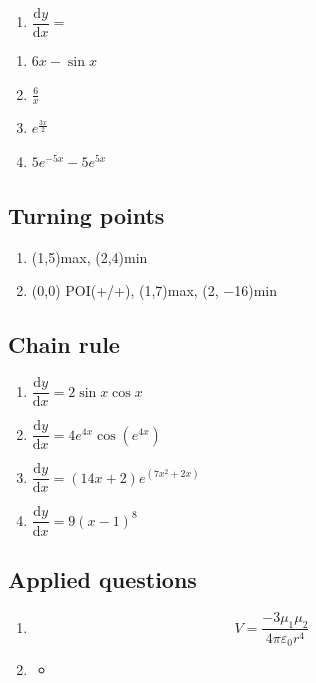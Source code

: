 \documentclass[
]{book}
\providecommand{\tightlist}{%
  \setlength{\itemsep}{0pt}\setlength{\parskip}{0pt}}
\begin{document}
\begin{enumerate}
\def\labelenumi{\arabic{enumi}.}
\setcounter{enumi}{1}
\tightlist
\item
  \(\dfrac{\textrm{d}y}{\textrm{d}x}=\)
\end{enumerate}

\begin{enumerate}
\def\labelenumi{\alph{enumi}.}
\tightlist
\item
  \(6x-\sin x\)
\item
  \(\frac{6}{x}\)
\item
  \(e^{\frac{3x}{2}}\)
\item
  \(5e^{-5x}-5e^{5x}\)
\end{enumerate}

\hypertarget{turning-points-1}{%
\subsection{Turning points}\label{turning-points-1}}

\begin{enumerate}
\def\labelenumi{\arabic{enumi}.}
\tightlist
\item
  (1,5)max, (2,4)min
\item
  (0,0) POI(+/+), (1,7)max, (2, −16)min
\end{enumerate}

\hypertarget{chain-rule-1}{%
\subsection{Chain rule}\label{chain-rule-1}}

\begin{enumerate}
\def\labelenumi{\arabic{enumi}.}
\tightlist
\item
  \(\dfrac{\textrm{d}y}{\textrm{d}x}= 2 \sin x \cos x\)
\item
  \(\dfrac{\textrm{d}y}{\textrm{d}x}=4e^{4x}\cos (e^{4x})\)
\item
  \(\dfrac{\textrm{d}y}{\textrm{d}x}= (14x+2)e^{(7x^2 + 2x)}\)
\item
  \(\dfrac{\textrm{d}y}{\textrm{d}x}= 9 (x-1)^8\)
\end{enumerate}

\hypertarget{applied-questions-1}{%
\subsection{Applied questions}\label{applied-questions-1}}

\begin{enumerate}
\def\labelenumi{\arabic{enumi}.}
\item
  \begin{equation*}
  V = \frac{-3 \mu_1 \mu_2}{4 \pi \varepsilon_0 r^4}
  \end{equation*}
\item
  \begin{itemize}
  \item
  \end{itemize}
\end{enumerate}
\end{document}
